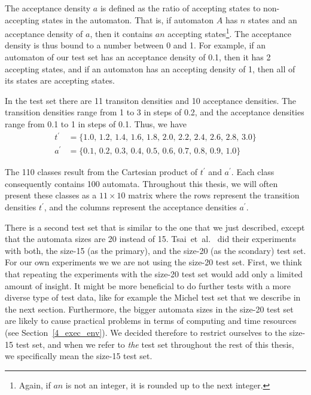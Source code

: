 The acceptance density $a$ is defined as the ratio of accepting states to non-accepting states in the automaton. That is, if automaton $A$ has $n$ states and an acceptance density of $a$, then it contains $an$ accepting states\footnote{Again, if $an$ is not an integer, it is rounded up to the next integer.}. The acceptance density is thus bound to a number between 0 and 1. For example, if an automaton of our test set has an acceptance density of 0.1, then it has 2 accepting states, and if an automaton has an accepting density of 1, then all of its states are accepting states.

In the \goal{} test set there are 11 transiton densities and 10 acceptance densities. The transition densities range from 1 to 3 in steps of 0.2, and the acceptance densities range from 0.1 to 1 in steps of 0.1. Thus, we have
\begin{align*}
t^\prime& = \{ 1.0,\,1.2,\,1.4,\,1.6,\,1.8,\,2.0,\,2.2,\,2.4,\,2.6,\,2.8,\,3.0 \} \\
a^\prime & = \{ 0.1,\,0.2,\,0.3,\,0.4,\,0.5,\,0.6,\,0.7,\,0.8,\,0.9,\,1.0 \}
\end{align*}

The 110 classes result from the Cartesian product of $t^\prime$ and $a^\prime$. Each class consequently contains 100 automata. Throughout this thesis, we will often present these classes as a $11 \times 10$ matrix where the rows represent the transition densities $t^\prime$, and the columns represent the acceptance densities $a^\prime$.

There is a second \goal{} test set that is similar to the one that we just described, except that the automata sizes are 20 instead of 15. Tsai~et~al.~\cite{2010_tsai} did their experiments with both, the size-15 (as the primary), and the size-20 (as the scondary) test set. For our own experiments we we are not using the size-20 test set. First, we think that repeating the experiments with the size-20 test set would add only a limited amount of insight. It might be more beneficial to do further tests with a more diverse type of test data, like for example the Michel test set that we describe in the next section. Furthermore, the bigger automata sizes in the size-20 test set are likely to cause practical problems in terms of computing and time resources (see Section~\ref{4_exec_env}). We decided therefore to restrict ourselves to the size-15 test set, and when we refer to \textit{the} \goal{} test set throughout the rest of this thesis, we specifically mean the size-15 test set.

